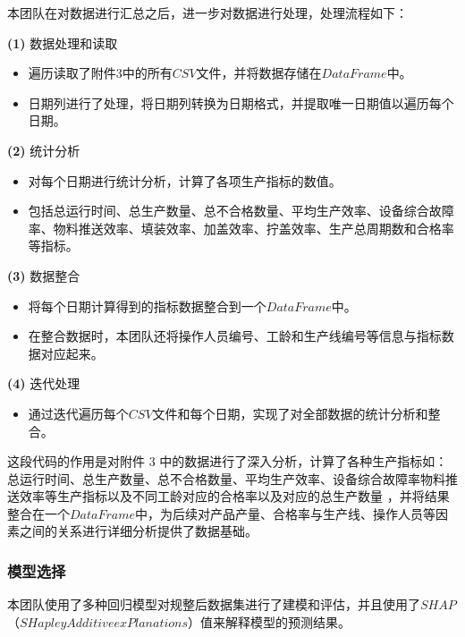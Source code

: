 \documentclass[withoutpreface,bwprint]{cumcmthesis}
\begin{document}
本团队在对数据进行汇总之后，进一步对数据进行处理，处理流程如下：

\textbf{(1)} 数据处理和读取

\begin{itemize}
    \item 遍历读取了附件3中的所有\(CSV\)文件，并将数据存储在\(DataFrame\)中。
    \item 日期列进行了处理，将日期列转换为日期格式，并提取唯一日期值以遍历每个日期。
\end{itemize}

\textbf{(2)} 统计分析

\begin{itemize}
    \item 对每个日期进行统计分析，计算了各项生产指标的数值。
    \item 包括总运行时间、总生产数量、总不合格数量、平均生产效率、设备综合故障率、物料推送效率、填装效率、加盖效率、拧盖效率、生产总周期数和合格率等指标。
\end{itemize}

\textbf{(3)} 数据整合

\begin{itemize}
    \item 将每个日期计算得到的指标数据整合到一个\(DataFrame\)中。
    \item 在整合数据时，本团队还将操作人员编号、工龄和生产线编号等信息与指标数据对应起来。
\end{itemize}

\textbf{(4)} 迭代处理

\begin{itemize}
    \item 通过迭代遍历每个\(CSV\)文件和每个日期，实现了对全部数据的统计分析和整合。
\end{itemize}

这段代码的作用是对附件 3 中的数据进行了深入分析，计算了各种生产指标如：总运行时间、总生产数量、总不合格数量、平均生产效率、设备综合故障率物料推送效率等生产指标以及不同工龄对应的合格率以及对应的总生产数量
，并将结果整合在一个\(DataFrame\)中，为后续对产品产量、合格率与生产线、操作人员等因素之间的关系进行详细分析提供了数据基础。

\subsubsection{模型选择}

本团队使用了多种回归模型对规整后数据集进行了建模和评估，并且使用了\(SHAP\)（\(SHapley Additive exPlanations\)）值来解释模型的预测结果。
\end{document}

